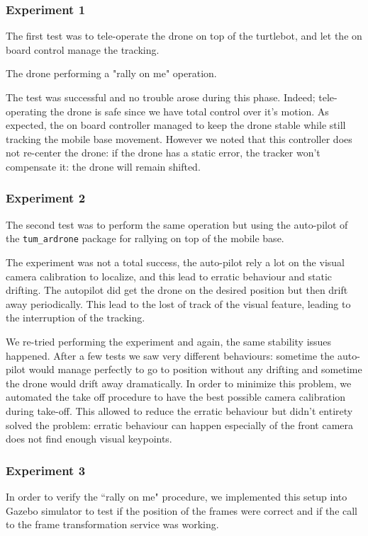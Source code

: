 \documentclass[11pt,a4paper,twocolumn]{article}
\begin{document}
\subsubsection{Experiment 1}
The first test was to tele-operate the drone on top of the turtlebot, and let the on board control
manage the tracking.

The drone performing a "rally on me" operation.

The test was successful and no trouble arose during this phase. Indeed; tele-operating the drone is 
safe since we have total control over it's motion.
As expected, the on board controller managed to keep the drone stable while still tracking the mobile base 
movement. However we noted that this controller does not re-center the drone: if the drone has a static
error, the tracker won't compensate it: the drone will remain shifted.

\subsubsection{Experiment 2}
The second test was to perform the same operation but using the auto-pilot of the \verb!tum_ardrone!
package for rallying on top of the mobile base.

The experiment was not a total success, the auto-pilot rely a lot on the visual camera calibration to 
localize, and this lead to erratic behaviour and static drifting.
The autopilot did get the drone on the desired position but then drift away periodically. This lead to the 
lost of track of the visual feature, leading to the interruption of the tracking.

We re-tried performing the experiment and again, the same stability issues happened. After a few tests we 
saw very different behaviours: sometime the auto-pilot would manage perfectly to go to position without any
drifting and sometime the drone would drift away dramatically. In order to minimize this problem, we 
automated the take off procedure to have the best possible camera calibration during take-off. This 
allowed to reduce the erratic behaviour but didn't entirety solved the problem: erratic behaviour can happen
especially of the front camera does not find enough visual keypoints.

\subsubsection{Experiment 3}
In order to verify the ``rally on me" procedure, we implemented this setup into Gazebo simulator to test if
the position of the frames were correct and if the call to the frame transformation service was working.
\end{document}
